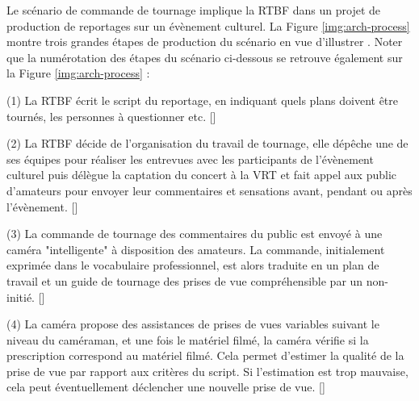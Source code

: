 Le scénario de commande de tournage implique la RTBF dans un projet de production de reportages sur un évènement culturel.
La Figure \ref{img:arch-process} montre trois grandes étapes de production du scénario en vue d'illustrer . 
Noter que la numérotation des étapes du scénario ci-dessous se retrouve également sur la Figure \ref{img:arch-process} :
\begin{listenum}
	\item[(1)] La RTBF écrit le script du reportage, en indiquant quels plans doivent être tournés, les personnes à questionner etc. [] 
	
	\item[(2)] La RTBF décide de l'organisation du travail de tournage, elle dépêche une de ses équipes pour réaliser les entrevues avec les participants de l'évènement culturel puis délègue la captation du concert à la VRT et fait appel aux public d'amateurs pour envoyer leur commentaires et sensations avant, pendant ou après l'évènement. [] 

	\item[(3)] La commande de tournage des commentaires du public est envoyé à une caméra "intelligente" à disposition des amateurs. La commande, initialement exprimée dans le vocabulaire professionnel, est alors traduite en un plan de travail et un guide de tournage des prises de vue compréhensible par un non-initié. []
	
	\item[(4)] La caméra propose des assistances de prises de vues variables suivant le niveau du caméraman, et une fois le matériel filmé, la caméra vérifie si la prescription correspond au matériel filmé. Cela permet d'estimer la qualité de la prise de vue par rapport aux critères du script. Si l'estimation est trop mauvaise, cela peut éventuellement déclencher une nouvelle prise de vue. []
	

\end{listenum}
